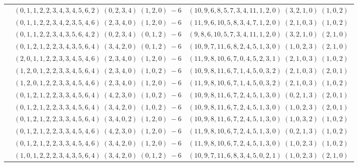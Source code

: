 \documentclass[11pt]{article}
\begin{document}
\begin{longtable}[l]{|c|c|c|}
 \cline{2-3} 
 & $(0 ,1 ,1 ,2 ,2 ,3 ,4 ,3 ,4 ,5 ,6 ,2) \;(0 ,2 ,3 ,4) \;(1 ,2 ,0) \;-6$ & $(10 ,9 ,6 ,8 ,5 ,7 ,3 ,4 ,11 ,1 ,2 ,0) \;(3 ,2 ,1 ,0) \;(1 ,0 ,2) \;$\\ 
 \cline{2-3} 
 & $(0 ,1 ,1 ,2 ,2 ,3 ,4 ,2 ,3 ,5 ,4 ,6) \;(2 ,3 ,4 ,0) \;(1 ,2 ,0) \;-6$ & $(11 ,9 ,6 ,10 ,5 ,8 ,3 ,4 ,7 ,1 ,2 ,0) \;(2 ,1 ,0 ,3) \;(1 ,0 ,2) \;$\\ 
 \cline{2-3} 
 & $(0 ,1 ,1 ,2 ,2 ,3 ,4 ,3 ,5 ,6 ,4 ,2) \;(0 ,2 ,3 ,4) \;(0 ,1 ,2) \;-6$ & $(9 ,8 ,6 ,10 ,5 ,7 ,3 ,4 ,11 ,1 ,2 ,0) \;(3 ,2 ,1 ,0) \;(2 ,1 ,0) \;$\\ 
 \cline{2-3} 
 & $(0 ,1 ,2 ,1 ,2 ,2 ,3 ,4 ,3 ,5 ,6 ,4) \;(3 ,4 ,2 ,0) \;(0 ,1 ,2) \;-6$ & $(10 ,9 ,7 ,11 ,6 ,8 ,2 ,4 ,5 ,1 ,3 ,0) \;(1 ,0 ,2 ,3) \;(2 ,1 ,0) \;$\\ 
 \cline{2-3} 
 & $(2 ,0 ,1 ,1 ,2 ,2 ,3 ,3 ,4 ,5 ,4 ,6) \;(2 ,3 ,4 ,0) \;(1 ,2 ,0) \;-6$ & $(11 ,9 ,8 ,10 ,6 ,7 ,0 ,4 ,5 ,2 ,3 ,1) \;(2 ,1 ,0 ,3) \;(1 ,0 ,2) \;$\\ 
 \cline{2-3} 
 & $(1 ,2 ,0 ,1 ,2 ,2 ,3 ,3 ,4 ,5 ,6 ,4) \;(2 ,3 ,4 ,0) \;(1 ,0 ,2) \;-6$ & $(10 ,9 ,8 ,11 ,6 ,7 ,1 ,4 ,5 ,0 ,3 ,2) \;(2 ,1 ,0 ,3) \;(2 ,0 ,1) \;$\\ 
 \cline{2-3} 
 & $(1 ,2 ,0 ,1 ,2 ,2 ,3 ,3 ,4 ,5 ,4 ,6) \;(2 ,3 ,4 ,0) \;(1 ,2 ,0) \;-6$ & $(11 ,9 ,8 ,10 ,6 ,7 ,1 ,4 ,5 ,0 ,3 ,2) \;(2 ,1 ,0 ,3) \;(1 ,0 ,2) \;$\\ 
 \cline{2-3} 
 & $(0 ,1 ,2 ,1 ,2 ,2 ,3 ,3 ,4 ,5 ,6 ,4) \;(4 ,2 ,3 ,0) \;(1 ,0 ,2) \;-6$ & $(10 ,9 ,8 ,11 ,6 ,7 ,2 ,4 ,5 ,1 ,3 ,0) \;(0 ,2 ,1 ,3) \;(2 ,0 ,1) \;$\\ 
 \cline{2-3} 
 & $(0 ,1 ,2 ,1 ,2 ,2 ,3 ,3 ,4 ,5 ,6 ,4) \;(3 ,4 ,2 ,0) \;(1 ,0 ,2) \;-6$ & $(10 ,9 ,8 ,11 ,6 ,7 ,2 ,4 ,5 ,1 ,3 ,0) \;(1 ,0 ,2 ,3) \;(2 ,0 ,1) \;$\\ 
 \cline{2-3} 
 & $(0 ,1 ,2 ,1 ,2 ,2 ,3 ,3 ,4 ,5 ,6 ,4) \;(3 ,4 ,0 ,2) \;(1 ,2 ,0) \;-6$ & $(10 ,9 ,8 ,11 ,6 ,7 ,2 ,4 ,5 ,1 ,3 ,0) \;(1 ,0 ,3 ,2) \;(1 ,0 ,2) \;$\\ 
 \cline{2-3} 
 & $(0 ,1 ,2 ,1 ,2 ,2 ,3 ,3 ,4 ,5 ,4 ,6) \;(4 ,2 ,3 ,0) \;(1 ,2 ,0) \;-6$ & $(11 ,9 ,8 ,10 ,6 ,7 ,2 ,4 ,5 ,1 ,3 ,0) \;(0 ,2 ,1 ,3) \;(1 ,0 ,2) \;$\\ 
 \cline{2-3} 
 & $(0 ,1 ,2 ,1 ,2 ,2 ,3 ,3 ,4 ,5 ,4 ,6) \;(3 ,4 ,2 ,0) \;(1 ,2 ,0) \;-6$ & $(11 ,9 ,8 ,10 ,6 ,7 ,2 ,4 ,5 ,1 ,3 ,0) \;(1 ,0 ,2 ,3) \;(1 ,0 ,2) \;$\\ 
 \cline{2-3} 
 & $(1 ,0 ,1 ,2 ,2 ,2 ,3 ,4 ,3 ,5 ,6 ,4) \;(3 ,4 ,2 ,0) \;(0 ,1 ,2) \;-6$ & $(10 ,9 ,7 ,11 ,6 ,8 ,3 ,4 ,5 ,0 ,2 ,1) \;(1 ,0 ,2 ,3) \;(2 ,1 ,0) \;$\\ 

\end{longtable}
\end{document}

